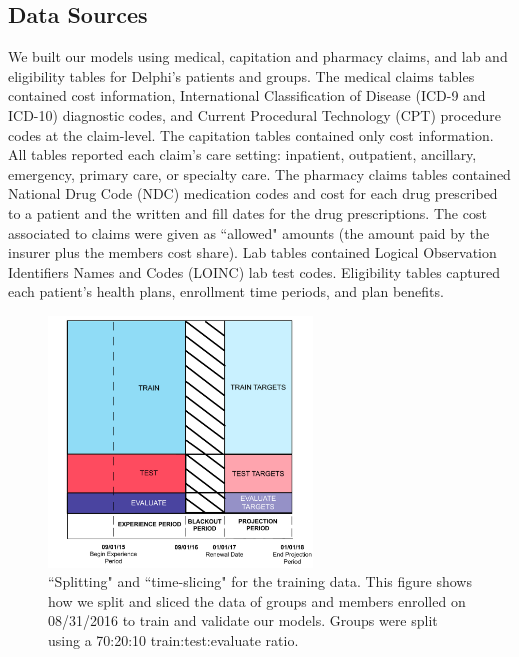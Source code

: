 \documentclass[letterpaper]{article} %
\begin{document}
\subsection{Data Sources}
We built our models using medical, capitation and pharmacy claims, and lab and eligibility tables for Delphi's patients and groups. The medical claims tables contained cost information, International Classification of Disease (ICD-9 and ICD-10) diagnostic codes, and Current Procedural Technology (CPT) procedure codes at the claim-level. The capitation tables contained only cost information. All tables reported each claim's care setting: inpatient, outpatient, ancillary, emergency, primary care, or specialty care. The pharmacy claims tables contained National Drug Code (NDC) medication codes and cost for each drug prescribed to a patient and the written and fill dates for the drug prescriptions. The cost associated to claims were given as ``allowed" amounts (the amount paid by the insurer plus the members cost share). Lab tables contained Logical Observation Identifiers Names and Codes (LOINC) lab test codes.  Eligibility tables captured each patient's health plans, enrollment time periods, and plan benefits.





\begin{figure}
	\centering
  \includegraphics[width=70mm]{fig-2-train-test-evaluate-split.pdf}
  \caption{``Splitting" and ``time-slicing" for the training data. This figure shows how we split and sliced the data of groups and members enrolled on 08/31/2016 to train and validate our models. Groups were split using a 70:20:10 train:test:evaluate ratio.}
  \label{fig:fig2}
\end{figure}
\end{document}
